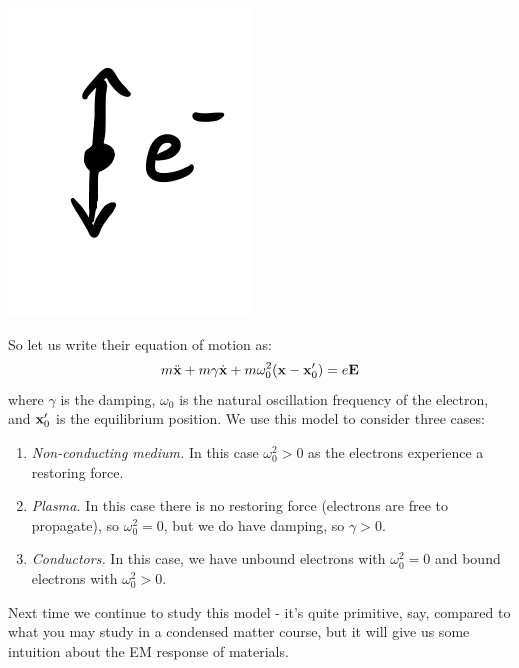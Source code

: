 \begin{center}
    \includegraphics[scale=0.35]{Lectures/Images/lec13-oscillatinge.png}
\end{center}

So let us write their equation of motion as:
\begin{equation}
    m\ddot{\mathbf{x}} + m\gamma \dot{\mathbf{x}} + m\omega_0^2(\mathbf{x} - \mathbf{x}_0') = e\mathbf{E}
\end{equation}
where $\gamma$ is the damping, $\omega_0$ is the natural oscillation frequency of the electron, and $\mathbf{x}_0'$ is the equilibrium position. We use this model to consider three cases:
\begin{enumerate}
    \item \emph{Non-conducting medium.} In this case $\omega_0^2 > 0$ as the electrons experience a restoring force.
    \item \emph{Plasma.} In this case there is no restoring force (electrons are free to propagate), so $\omega_0^2 = 0$, but we do have damping, so $\gamma > 0$.
    \item \emph{Conductors.} In this case, we have unbound electrons with $\omega_0^2 = 0$ and bound electrons with $\omega_0^2 > 0$.
\end{enumerate}

Next time we continue to study this model - it's quite primitive, say, compared to what you may study in a condensed matter course, but it will give us some intuition about the EM response of materials.